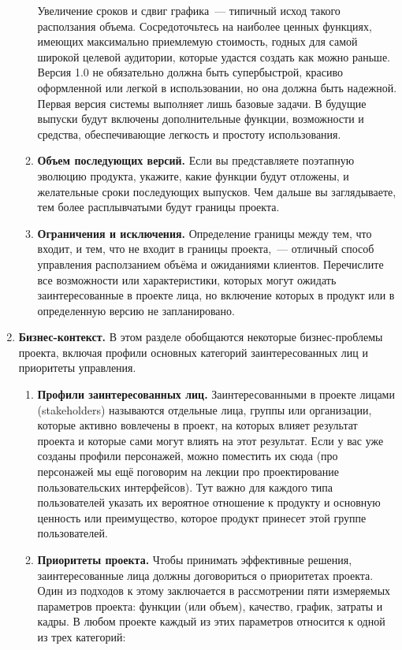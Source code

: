 \documentclass{../../text-style}
\begin{document}
\begin{enumerate}
\begin{enumerate}
        Увеличение сроков и сдвиг графика~--- типичный исход такого расползания объема. Сосредоточьтесь на наиболее ценных функциях, имеющих максимально приемлемую стоимость, годных для самой широкой целевой аудитории, которые удастся создать как можно раньше. Версия 1.0 не обязательно должна быть супербыстрой, красиво оформленной или легкой в использовании, но она должна быть надежной. Первая версия системы выполняет лишь базовые задачи. В будущие выпуски будут включены дополнительные функции, возможности и средства, обеспечивающие легкость и простоту использования.
        \item \textbf{Объем последующих версий.} Если вы представляете поэтапную эволюцию продукта, укажите, какие функции будут отложены, и желательные сроки последующих выпусков. Чем дальше вы заглядываете, тем более расплывчатыми будут границы проекта.
        \item \textbf{Ограничения и исключения.} Определение границы между тем, что входит, и тем, что не входит в границы проекта,~--- отличный способ управления расползанием объёма и ожиданиями клиентов. Перечислите все возможности или характеристики, которых могут ожидать заинтересованные в проекте лица, но включение которых в продукт или в определенную версию не запланировано.
    \end{enumerate}
    \item \textbf{Бизнес-контекст.} В этом разделе обобщаются некоторые бизнес-проблемы проекта, включая профили основных категорий заинтересованных лиц и приоритеты управления.
    \begin{enumerate}
        \item \textbf{Профили заинтересованных лиц.} Заинтересованными в проекте лицами (stakeholders) называются отдельные лица, группы или организации, которые активно вовлечены в проект, на которых влияет результат проекта и которые сами могут влиять на этот результат. Если у вас уже созданы профили персонажей, можно поместить их сюда (про персонажей мы ещё поговорим на лекции про проектирование пользовательских интерфейсов). Тут важно для каждого типа пользователей указать их вероятное отношение к продукту и основную ценность или преимущество, которое продукт принесет этой группе пользователей.
        \item \textbf{Приоритеты проекта.} Чтобы принимать эффективные решения, заинтересованные лица должны договориться о приоритетах проекта. Один из подходов к этому заключается в рассмотрении пяти измеряемых параметров проекта: функции (или объем), качество, график, затраты и кадры. В любом проекте каждый из этих параметров относится к одной из трех категорий:

\end{enumerate}
\end{enumerate}
\end{document}
